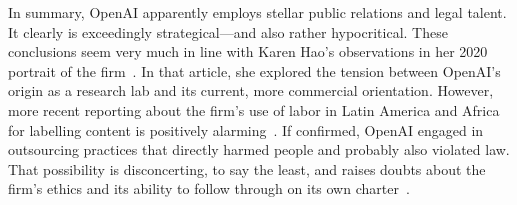 In summary, OpenAI apparently employs stellar public relations and legal talent.
It clearly is exceedingly strategical---and also rather hypocritical. These
conclusions seem very much in line with Karen Hao's observations in her 2020
portrait of the firm~\cite{Hao2020}. In that article, she explored the tension
between OpenAI's origin as a research lab and its current, more commercial
orientation. However, more recent reporting about the firm's use of labor in
Latin America and Africa for labelling content is positively
alarming~\cite{HaoHernandez2022,Perrigo2023a}. If confirmed, OpenAI engaged in
outsourcing practices that directly harmed people and probably also violated
 law. That possibility is disconcerting, to say the least, and raises
doubts about the firm's ethics and its ability to follow through on its own
charter~\cite{OpenAI2018}.
